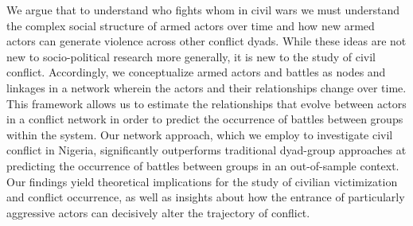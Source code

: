 We argue that to understand who fights whom in civil wars we must understand the complex social structure of armed actors over time and how new armed actors can generate violence across other conflict dyads. While these ideas are not new to socio-political research more generally, it is new to the study of civil conflict. Accordingly, we conceptualize armed actors and battles as nodes and linkages in a network wherein the actors and their relationships change over time. This framework allows us to estimate the relationships that evolve between actors in a conflict network in order to predict the occurrence of battles between groups within the system.  Our network approach, which we employ to investigate civil conflict in Nigeria, significantly outperforms traditional dyad-group approaches at predicting the occurrence of battles between groups in an out-of-sample context. Our findings yield theoretical implications for the study of civilian victimization and conflict occurrence, as well as insights about how the entrance of particularly aggressive actors can decisively alter the trajectory of conflict.



